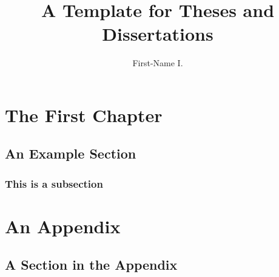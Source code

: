\documentclass[numbered,pdftex]{ohio-etd}
\title     {A Template for Theses and Dissertations}
\author    {First-Name I.}{Last-Name}
\begin{document}
\makefrontmatter    %


\chapter{The First Chapter}
\section{An Example Section}
\subsection{This is a subsection}


\appendix           %

\chapter{An Appendix}
\section{A Section in the Appendix}
\end{document}
